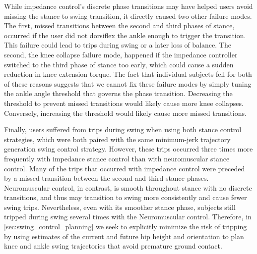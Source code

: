 \begin{comment}
One possible important difference between the
implemented neuromuscular and impedance control strategies was that impedance
control typically provided much more ankle push of work, as shown in
\cref{fig:treadmill_exp_ankle_work}. In impedance control, the transition
transition to the third phase of gait generates a large burst of ankle power,
which users may interpret as a signal that the prosthesis is ready to enter
swing. In contrast, neuromuscular control may not have provided any such signal
due to the lack of ankle work. It is possible that such cues to the user should
be explicitly considered in the design of prosthesis controllers, especially
when they can help inform correct transition of discrete state.
\begin{marginfigure}
    \centering 
    \missingfigure[figwidth=\textwidth]{ankle work}
    \caption{Normal Walking, impedance and neuromuscular control ankle
    work.}\label{fig:treadmill_exp_ankle_work}
\end{marginfigure}
\end{comment}

While impedance control's discrete phase transitions may have helped users avoid
missing the stance to swing transition, it directly caused two other failure
modes. The first, missed transitions between the second and third phases of
stance, occurred if the user did not dorsiflex the ankle enough to trigger the
transition. This failure could lead to trips during swing or a later loss of
balance. The second, the knee collapse failure mode, happened if the impedance
controller switched to the third phase of stance too early, which could cause a
sudden reduction in knee extension torque. The fact that individual subjects
fell for both of these reasons suggests that we cannot fix these failure modes
by simply tuning the ankle angle threshold that governs the phase transition.
Decreasing the threshold to prevent missed transitions would likely cause more
knee collapses. Conversely, increasing the threshold would likely cause more
missed transitions. 

Finally, users suffered from trips during swing when using both stance control
strategies, which were both paired with the same minimum-jerk trajectory
generation swing control strategy. However, these trips occurred three times
more frequently with impedance stance control than with neuromuscular stance
control. Many of the trips that occurred with impedance control were preceded by
a missed transition between the second and third stance phases. Neuromuscular
control, in contrast, is smooth throughout stance with no discrete transitions,
and thus may transition to swing more consistently and cause fewer swing trips.
Nevertheless, even with its smoother stance phase, subjects still tripped during
swing several times with the Neuromuscular control. Therefore, in
\cref{sec:swing_control_planning} we seek to explicitly minimize the risk of
tripping by using estimates of the current and future hip height and orientation
to plan knee and ankle swing trajectories that avoid premature ground contact.

